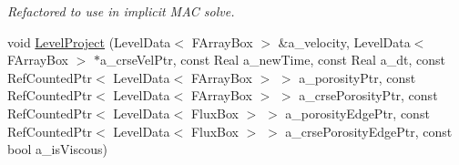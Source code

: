 \begin{DoxyCompactItemize}
\begin{DoxyCompactList}\small\item\em Refactored to use in implicit M\-A\-C solve. \end{DoxyCompactList}\item 
\hypertarget{class_c_c_projector_a89be4cb355ab581f1040033491dcaab7}{void \hyperlink{class_c_c_projector_a89be4cb355ab581f1040033491dcaab7}{Level\-Project} (Level\-Data$<$ F\-Array\-Box $>$ \&a\-\_\-velocity, Level\-Data$<$ F\-Array\-Box $>$ $\ast$a\-\_\-crse\-Vel\-Ptr, const Real a\-\_\-new\-Time, const Real a\-\_\-dt, const Ref\-Counted\-Ptr$<$ Level\-Data$<$ F\-Array\-Box $>$ $>$ a\-\_\-porosity\-Ptr, const Ref\-Counted\-Ptr$<$ Level\-Data$<$ F\-Array\-Box $>$ $>$ a\-\_\-crse\-Porosity\-Ptr, const Ref\-Counted\-Ptr$<$ Level\-Data$<$ Flux\-Box $>$ $>$ a\-\_\-porosity\-Edge\-Ptr, const Ref\-Counted\-Ptr$<$ Level\-Data$<$ Flux\-Box $>$ $>$ a\-\_\-crse\-Porosity\-Edge\-Ptr, const bool a\-\_\-is\-Viscous)}\label{class_c_c_projector_a89be4cb355ab581f1040033491dcaab7}


\end{DoxyCompactItemize}
